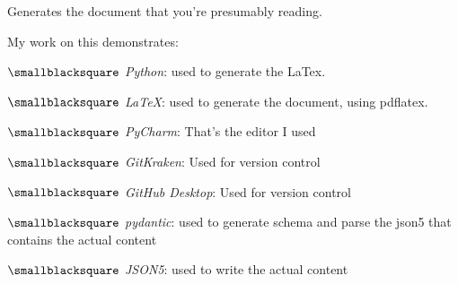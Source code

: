 \documentclass[10mm,letterpaper,notitlepage]{article}
\begin{document}
{{								\setlength{\parindent}{\parindent-4mm}
							\par}
							{\color[RGB]{0, 0, 0}
							\fontsize{2.25mm}{3.0mm}\selectfont
									{\color[RGB]{108, 29, 169}
									\fontsize{4.5mm}{6.0mm}\selectfont
									\color[RGB]{93, 116, 191}{{[}}\color[RGB]{97, 101, 186}{{ }}\color[RGB]{102, 80, 179}{{]}}\color[RGB]{102, 76, 178}{{ }}
									\par}
							Generates the document that you're presumably reading.
							
							My work on this demonstrates:
								\setlength{\parindent}{\parindent+4mm}
								
								\nopagebreak
								$\smallblacksquare$ \textit{Python}: used to generate the LaTex.
								
								$\smallblacksquare$ \textit{LaTeX}: used to generate the document, using pdflatex.
								
								$\smallblacksquare$ \textit{PyCharm}: That's the editor I used
								
								$\smallblacksquare$ \textit{GitKraken}: Used for version control
								
								$\smallblacksquare$ \textit{GitHub Desktop}: Used for version control
								
								$\smallblacksquare$ \textit{pydantic}: used to generate schema and parse the json5 that contains the actual content
								
								$\smallblacksquare$ \textit{JSON5}: used to write the actual content
								
								\setlength{\parindent}{\parindent-4mm}
							\par}
					\setlength{\parindent}{\parindent-4mm}
				\setlength{\parindent}{\parindent-4mm}
			\par}
\end{document}
